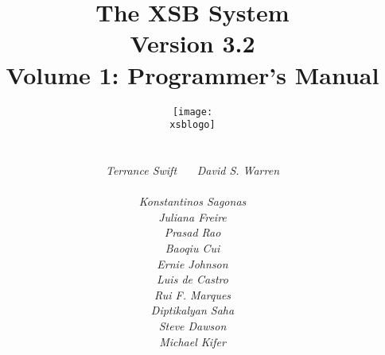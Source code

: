 \documentclass[11pt]{report}
\newcommand{\version}{Version 3.2}
\newcommand{\xsblogo}{{xsb-logo}}
\begin{document}
\title{\bf The XSB System \\ \version \\ Volume 1: Programmer's Manual}

\author{{\texttt{[image: \\xsblogo]}}\\
        \ \\ \ \\
        {\em Terrance Swift} \ \ \ 
        {\em David S. Warren} \\ 
        \ \\
        {\em Konstantinos Sagonas} \\
        {\em Juliana Freire} \\
        {\em Prasad Rao} \\
        {\em Baoqiu Cui} \\
        {\em Ernie Johnson} \\
        {\em Luis de Castro} \\
        {\em Rui F. Marques} \\
        {\em Diptikalyan Saha} \\
        {\em Steve Dawson} \\
        {\em Michael Kifer} \\
        \ \\
} 

\maketitle

\thispagestyle{empty}


\newpage
\thispagestyle{empty}
\tableofcontents
\newpage        %
  


















\appendix



% 





\printindex
\printindex[pred]
\end{document}
